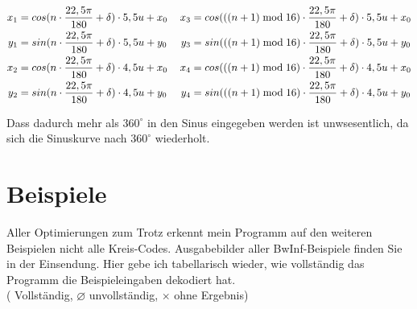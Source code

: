 \begin{gather}
	\begin{split}
		x_1 &= cos(n \cdot \frac{22,5\pi}{180} + \delta) \cdot 5,5u + x_0\\
		y_1 &= sin(n \cdot \frac{22,5\pi}{180} + \delta) \cdot 5,5u + y_0\\ \vspace{2em}
		x_2 &= cos(n \cdot \frac{22,5\pi}{180} + \delta) \cdot 4,5u + x_0\\
		y_2 &= sin(n \cdot \frac{22,5\pi}{180} + \delta) \cdot 4,5u + y_0
	\end{split}
	\hspace{1.2em}
	\begin{split}
		x_3 &= cos(((n+1)\bmod{}16) \cdot \frac{22,5\pi}{180} + \delta) \cdot 5,5u + x_0\\
		y_3 &= sin(((n+1)\bmod{}16) \cdot \frac{22,5\pi}{180} + \delta) \cdot 5,5u + y_0 \\ \vspace{2em}
		x_4 &= cos(((n+1)\bmod{}16) \cdot \frac{22,5\pi}{180} + \delta) \cdot 4,5u + x_0\\
		y_4 &= sin(((n+1)\bmod{}16) \cdot \frac{22,5\pi}{180} + \delta) \cdot 4,5u + y_0
	\end{split} \label{eq:nKoordsNeu}
\end{gather}

Dass dadurch mehr als \(360^{\circ}\) in den Sinus eingegeben werden ist unwsesentlich, da sich die Sinuskurve nach \(360^{\circ}\) wiederholt.
\pagebreak
\section{Beispiele}
Aller Optimierungen zum Trotz erkennt mein Programm auf den weiteren Beispielen nicht alle Kreis-Codes. Ausgabebilder aller BwInf-Beispiele finden Sie in der Einsendung. Hier gebe ich tabellarisch wieder, wie vollständig das Programm die Beispieleingaben dekodiert hat. \\ 
(\checkmark{} Vollständig, \(\varnothing\) unvollständig, \(\times\) ohne Ergebnis)

